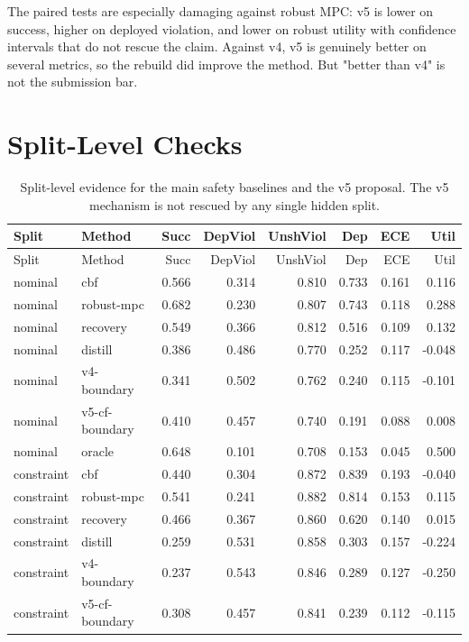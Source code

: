 \documentclass{article}
\begin{document}
The paired tests are especially damaging against robust MPC: v5 is lower on success, higher on deployed violation, and lower on robust utility with confidence intervals that do not rescue the claim. Against v4, v5 is genuinely better on several metrics, so the rebuild did improve the method. But "better than v4" is not the submission bar.

\section{Split-Level Checks}

\begingroup
\scriptsize
\begin{longtable}{@{}llrrrrrr@{}}
\caption{Split-level evidence for the main safety baselines and the v5 proposal. The v5 mechanism is not rescued by any single hidden split.}\\
\toprule
Split & Method & Succ & DepViol & UnshViol & Dep & ECE & Util \\
\midrule
\endfirsthead
\toprule
Split & Method & Succ & DepViol & UnshViol & Dep & ECE & Util \\
\midrule
\endhead
nominal & cbf & 0.566 & 0.314 & 0.810 & 0.733 & 0.161 & 0.116 \\
nominal & robust-mpc & 0.682 & 0.230 & 0.807 & 0.743 & 0.118 & 0.288 \\
nominal & recovery & 0.549 & 0.366 & 0.812 & 0.516 & 0.109 & 0.132 \\
nominal & distill & 0.386 & 0.486 & 0.770 & 0.252 & 0.117 & -0.048 \\
nominal & v4-boundary & 0.341 & 0.502 & 0.762 & 0.240 & 0.115 & -0.101 \\
nominal & v5-cf-boundary & 0.410 & 0.457 & 0.740 & 0.191 & 0.088 & 0.008 \\
nominal & oracle & 0.648 & 0.101 & 0.708 & 0.153 & 0.045 & 0.500 \\
constraint & cbf & 0.440 & 0.304 & 0.872 & 0.839 & 0.193 & -0.040 \\
constraint & robust-mpc & 0.541 & 0.241 & 0.882 & 0.814 & 0.153 & 0.115 \\
constraint & recovery & 0.466 & 0.367 & 0.860 & 0.620 & 0.140 & 0.015 \\
constraint & distill & 0.259 & 0.531 & 0.858 & 0.303 & 0.157 & -0.224 \\
constraint & v4-boundary & 0.237 & 0.543 & 0.846 & 0.289 & 0.127 & -0.250 \\
constraint & v5-cf-boundary & 0.308 & 0.457 & 0.841 & 0.239 & 0.112 & -0.115 \\

\end{longtable}
\end{document}
